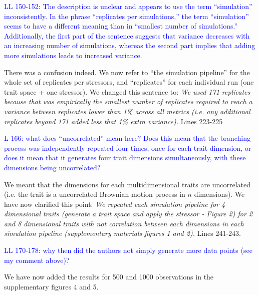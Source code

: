 \documentclass[
]{article}
\begin{document}

\textcolor{blue}{LL 150-152: The description is unclear and appears to use the term ``simulation'' inconsistently.
In the phrase ``replicates per simulations,'' the term ``simulation'' seems to have a different meaning than in ``smallest number of simulations.'' Additionally, the first part of the sentence suggests that variance decreases with an increasing number of simulations, whereas the second part implies that adding more simulations leads to increased variance.}

There was a confusion indeed.
We now refer to ``the simulation pipeline'' for the whole set of replicates per stressors, and ``replicates'' for each individual run (one trait space + one stressor).
We changed this sentence to:
\textit{We used 171 replicates because that was empirically the smallest number of replicates required to reach a variance between replicates lower than 1\% across all metrics (i.e. any additional replicates beyond 171 added less that 1\% extra variance).}
Lines 223-225

\textcolor{blue}{L 166: what does ``uncorrelated'' mean here? Does this mean that the branching process was independently repeated four times, once for each trait dimension, or does it mean that it generates four trait dimensions simultaneously, with these dimensions being uncorrelated?}

We meant that the dimensions for each multidimensional traits are uncorrelated (i.e. the trait is a uncorrelated Brownian motion process in $n$ dimensions).
We have now clarified this point:
\textit{We repeated each simulation pipeline for 4 dimensional traits (generate a trait space and apply the stressor - Figure 2) for 2 and 8 dimensional traits with not correlation between each dimensions in each simulation pipeline (supplementary materials figures 1 and 2).}
Lines 241-243.

\textcolor{blue}{LL 170-178: why then did the authors not simply generate more data points (see my comment above)?}

We have now added the results for 500 and 1000 observations in the supplementary figures 4 and 5.
\end{document}
